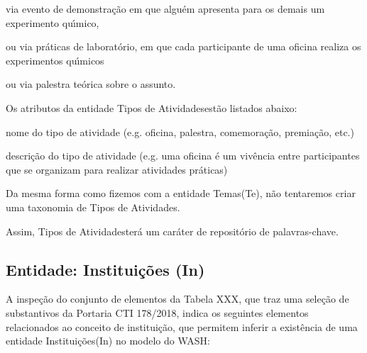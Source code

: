\documentclass[
12pt,		%
openright,	%
twoside,  %
a4paper,			%
chapter=TITLE,		%
english,			%
french,				%
spanish,			%
brazil				%
]{USPSC-classe/USPSC}
\begin{document}
\begin{alineas}
\item via evento de demonstra\c{c}\~ao em que algu\'em apresenta para os demais um experimento qu\'{\i}mico,
\item ou via pr\'aticas de laborat\'orio, em que cada participante de uma oficina realiza os experimentos qu\'{\i}micos
\item ou via palestra te\'orica sobre o assunto.
\end{alineas}

Os atributos da entidade \textquotedbl Tipos de Atividades\textquotedbl  est\~ao listados abaixo:










\begin{alineas}
\item nome do tipo de atividade (e.g. oficina, palestra, comemora\c{c}\~ao, premia\c{c}\~ao, etc.)
\item descri\c{c}\~ao do tipo de atividade (e.g. \textquotedbl uma oficina \'e um viv\^encia entre participantes que se organizam para realizar atividades pr\'aticas\textquotedbl )
\end{alineas}

Da mesma forma como fizemos com a entidade \textquotedbl Temas\textquotedbl  (Te), n\~ao tentaremos criar uma taxonomia de \textquotedbl Tipos de Atividades\textquotedbl .









Assim, \textquotedbl Tipos de Atividades\textquotedbl  ter\'a um car\'ater de reposit\'orio de palavras-chave.









\subsection[Entidade: Institui\c{c}\~oes (In)]{Entidade: Institui\c{c}\~oes (In)}\label{Entidade: Institui\c{c}\~oes (In)}
A inspe\c{c}\~ao do conjunto de elementos da Tabela XXX, que traz uma sele\c{c}\~ao de substantivos da Portaria CTI 178/2018, indica os seguintes elementos relacionados ao conceito de \textquotedbl institui\c{c}\~ao\textquotedbl , que permitem inferir a exist\^encia de uma entidade \textquotedbl Institui\c{c}\~oes\textquotedbl  (In) no modelo do WASH:
\end{document}
